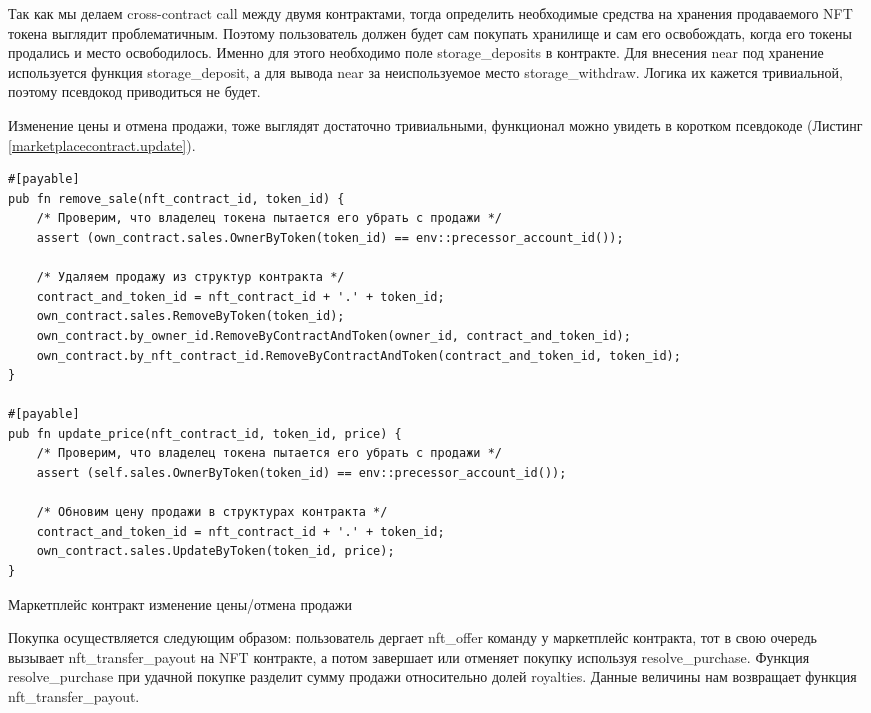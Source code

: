 Так как мы делаем cross-contract call между двумя контрактами, тогда определить необходимые средства на хранения продаваемого NFT токена выглядит проблематичным.
Поэтому пользователь должен будет сам покупать хранилище и сам его освобождать, когда его токены продались и место освободилось. Именно для этого необходимо поле storage\_deposits в контракте.
Для внесения near под хранение используется функция storage\_deposit, а для вывода near за неиспользуемое место storage\_withdraw. Логика их кажется тривиальной, поэтому псевдокод приводиться не будет.

Изменение цены и отмена продажи, тоже выглядят достаточно тривиальными, функционал можно увидеть в коротком псевдокоде (Листинг {\color{blue}\ref{marketplacecontract.update}}).

\begin{listing}
\begin{verbatim}
#[payable]
pub fn remove_sale(nft_contract_id, token_id) {
    /* Проверим, что владелец токена пытается его убрать с продажи */
    assert (own_contract.sales.OwnerByToken(token_id) == env::precessor_account_id());

    /* Удаляем продажу из структур контракта */
    contract_and_token_id = nft_contract_id + '.' + token_id;
    own_contract.sales.RemoveByToken(token_id);
    own_contract.by_owner_id.RemoveByContractAndToken(owner_id, contract_and_token_id);
    own_contract.by_nft_contract_id.RemoveByContractAndToken(contract_and_token_id, token_id);
}

#[payable]
pub fn update_price(nft_contract_id, token_id, price) {
    /* Проверим, что владелец токена пытается его убрать с продажи */
    assert (self.sales.OwnerByToken(token_id) == env::precessor_account_id());

    /* Обновим цену продажи в структурах контракта */
    contract_and_token_id = nft_contract_id + '.' + token_id;
    own_contract.sales.UpdateByToken(token_id, price);
}
\end{verbatim}
\caption{Маркетплейс контракт изменение цены/отмена продажи}
\label{marketplacecontract.update}
\end{listing}

Покупка осуществляется следующим образом: пользователь дергает nft\_offer команду у маркетплейс контракта, тот в свою очередь вызывает nft\_transfer\_payout на NFT контракте, а потом завершает или отменяет покупку используя resolve\_purchase.
Функция resolve\_purchase при удачной покупке разделит сумму продажи относительно долей royalties. Данные величины нам возвращает функция nft\_transfer\_payout.

